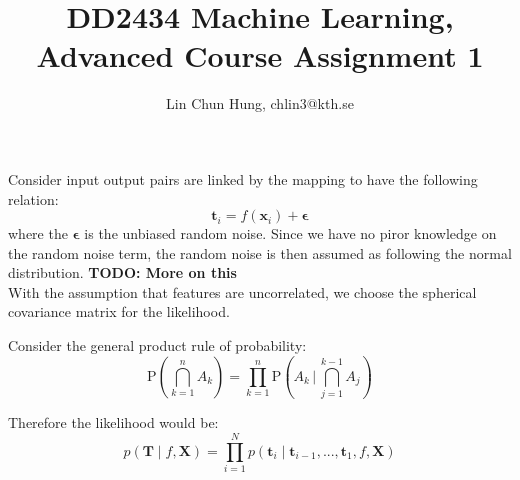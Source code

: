 \documentclass[12pt]{article}
\newenvironment{question}[2][Question]{\begin{trivlist}
\kern10pt
\item[\hskip \labelsep {\bfseries #1}\hskip \labelsep {\bfseries #2.}]}{\end{trivlist}}
\begin{document}
 
 
 
\title{DD2434 Machine Learning, Advanced Course Assignment 1}
\author{Lin Chun Hung, chlin3@kth.se} 
 
\maketitle

\begin{question}{1}
Consider input output pairs are linked by the mapping to have the following
 relation:
\begin{equation}
    \textbf{t}_i = f(\textbf{x}_i) + \bm{\epsilon}
\end{equation}
where the $\bm{\epsilon}$ is the unbiased random noise. Since we have no piror knowledge
on the random noise term, the random noise is then assumed as following the normal
distribution. \textbf{TODO: More on this}\\

With the assumption that features are uncorrelated, we choose the spherical
covariance matrix for the likelihood.
\end{question} %

\begin{question}{2}
Consider the general product rule of probability:
$$\mathrm {P} \left(\bigcap _{k=1}^{n}A_{k}\right)=
  \prod _{k=1}^{n}\mathrm {P} \left(A_{k}\,{\Bigg |}\,\bigcap _{j=1}^{k-1}A_{j}\right)$$

Therefore the likelihood would be:
\begin{equation}
  p(\textbf{T}\mid f,\textbf{X}) =
  \prod _{i=1}^{N}p(\textbf{t}_i \mid \textbf{t}_{i-1},...,\textbf{t}_{1},
  f,\textbf{X})
\end{equation}

\end{question} %
\end{document}
